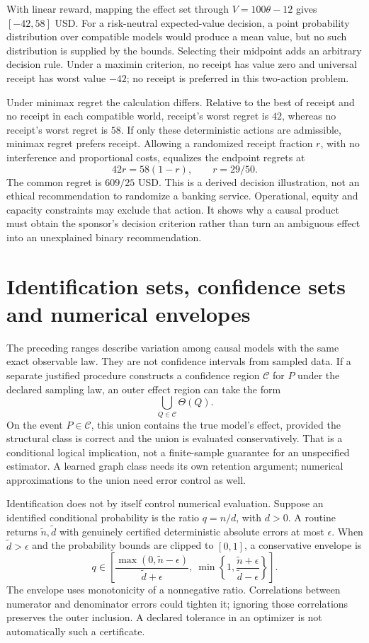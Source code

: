 With linear reward, mapping the effect set through
$V=100\theta-12$ gives $[-42,58]$ USD.
For a risk-neutral expected-value decision, a point
probability distribution over compatible models would
produce a mean value, but no such distribution is supplied
by the bounds. Selecting their midpoint adds an arbitrary
decision rule. Under a maximin criterion, no receipt has
value zero and universal receipt has worst value $-42$;
no receipt is preferred in this two-action problem.

Under minimax regret the calculation differs. Relative
to the best of receipt and no receipt in each compatible
world, receipt's worst regret is $42$, whereas no receipt's
worst regret is $58$. If only these deterministic actions
are admissible, minimax regret prefers receipt. Allowing a
randomized receipt fraction $r$, with no interference and
proportional costs, equalizes the endpoint regrets at
\[
 42r=58(1-r),\qquad r=29/50.
\]
The common regret is $609/25$ USD. This is a derived
decision illustration, not an ethical recommendation to
randomize a banking service. Operational, equity and
capacity constraints may exclude that action. It shows
why a causal product must obtain the sponsor's decision
criterion rather than turn an ambiguous effect into an
unexplained binary recommendation.\citep{exec17_s3_decision}

\section{Identification sets, confidence sets and numerical envelopes}
\label{exec17:s3-numerical}

The preceding ranges describe variation among causal models
with the same exact observable law. They are not confidence
intervals from sampled data. If a separate justified
procedure constructs a confidence region $\mathcal C$
for $P$ under the declared sampling law, an outer effect
region can take the form
\[
 \bigcup_{Q\in\mathcal C}\Theta(Q).
\]
On the event $P\in\mathcal C$, this union contains the true
model's effect, provided the structural class is correct
and the union is evaluated conservatively. That is a
conditional logical implication, not a finite-sample
guarantee for an unspecified estimator. A learned graph
class needs its own retention argument; numerical
approximations to the union need error control as well.

Identification does not by itself control numerical
evaluation. Suppose an identified conditional probability
is the ratio $q=n/d$, with $d>0$. A routine returns
$\widetilde n,\widetilde d$ with genuinely certified
deterministic absolute errors at most $\epsilon$. When
$\widetilde d>\epsilon$ and the probability bounds are
clipped to $[0,1]$, a conservative envelope is
\[
 q\in\left[
 \frac{\max(0,\widetilde n-\epsilon)}{\widetilde d+\epsilon},
 \ \min\left\{1,
 \frac{\widetilde n+\epsilon}{\widetilde d-\epsilon}\right\}
 \right].
\]
The envelope uses monotonicity of a nonnegative ratio.
Correlations between numerator and denominator errors
could tighten it; ignoring those correlations preserves
the outer inclusion. A declared tolerance in an optimizer
is not automatically such a certificate.

